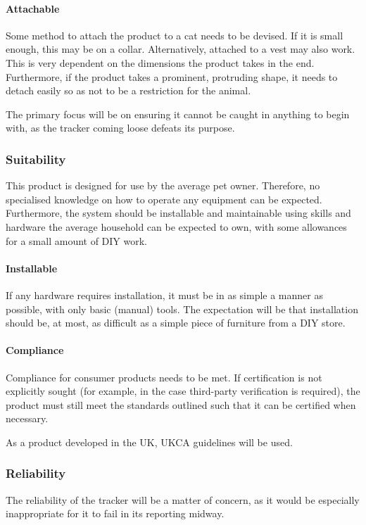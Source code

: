 \paragraph{Attachable}
Some method to attach the product to a cat needs to be devised. 
If it is small enough, this may be on a collar. Alternatively, 
attached to a vest may also work. This is very dependent on the 
dimensions the product takes in the end. 
Furthermore, if the product takes a prominent, protruding shape,
it needs to detach easily so as not to be a restriction for the animal.

The primary focus will be on ensuring it cannot be caught in anything to
begin with, as the tracker coming loose defeats its purpose.


\subsubsection{Suitability}
This product is designed for use by the average pet owner. Therefore, no 
specialised knowledge on how to operate any equipment can be expected. 
Furthermore, the system should be installable and maintainable using 
skills and hardware the average household can be expected to own, with some 
allowances for a small amount of DIY work. 

\paragraph{Installable}
If any hardware requires installation, it must be in as simple a manner as 
possible, with only basic (manual) tools. The expectation will be that installation
should be, at most, as difficult as a simple piece of furniture
 from a DIY store. 

\paragraph{Compliance}
Compliance for consumer products needs to be met. If certification
is not explicitly sought (for example, in the case third-party verification 
is required), the product must still meet the standards outlined such 
that it can be certified when necessary.

As a product developed in the UK, UKCA guidelines will be used. 


\subsubsection{Reliability}
The reliability of the tracker will be a matter of concern, 
as it would be especially inappropriate for it to fail in its reporting 
midway. 
